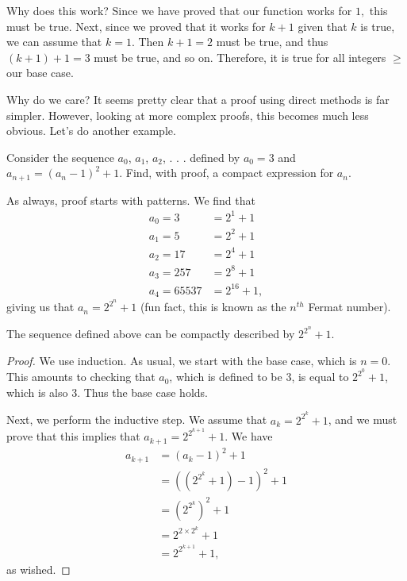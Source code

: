 \documentclass[11pt]{article}
\begin{document}
Why does this work? Since we have proved that our function works for $1,$ this must be true. Next, since we proved that it works for $k+1$ given that $k$ is true, we can assume that $k = 1$. Then $k+1 = 2$ must be true, and thus $(k+1) + 1 = 3$ must be true, and so on. Therefore, it is true for all integers $\geq$ our base case.

Why do we care? It seems pretty clear that a proof using direct methods is far simpler. However, looking at more complex proofs, this becomes much less obvious. Let's do another example.

\begin{example}
	Consider the sequence $a_0$, $a_1$, $a_2$, . . . defined by $a_0 = 3$ and $a_{n+1} = (a_n - 1)^2+1$. Find, with proof, a compact expression for $a_n$.
\end{example}
\begin{solution}
    As always, proof starts with patterns. We find that
    \begin{align*}
    	a_0 = 3 &= 2^1 + 1 \\ a_1 = 5 &= 2^2 + 1 \\ a_2 = 17 &= 2^{4} + 1\\ a_3 = 257 &= 2^8 + 1\\ a_4 = 65537 &= 2^{16}+1,
    \end{align*}
    giving us that $\boxed{a_n = 2^{2^n} + 1}$ (fun fact, this is known as the $n^{th}$ Fermat number).
\end{solution}
\begin{prop}
	The sequence defined above can be compactly described by $2^{2^n} + 1$.
\end{prop}
\begin{proof}
	We use induction. As usual, we start with the base case, which is $n = 0$. This amounts to checking that $a_0$, which is defined to be 3, is equal to $2^{2^0} + 1$, which is also 3. Thus the base case holds.
	
	Next, we perform the inductive step. We assume that $a_k = 2^{2^k} + 1$, and we must prove that this implies that $a_{k+1} = 2^{2^{k+1}} + 1.$ We have
	\begin{align*}
		a_{k+1} &= (a_k -1)^2+1 \\
		&= ((2^{2^k} +1) -1)^2 + 1 \\
		&= (2^{2^k})^2 + 1 \\
		&= 2^{2 \times 2^k} + 1 \\
		&= 2^{2^{k+1}} + 1,
	\end{align*}
	as wished.
\end{proof}
\end{document}
